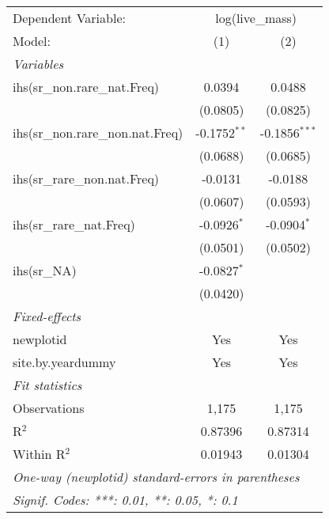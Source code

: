 \begin{tabular}{lcc}
\tabularnewline\midrule\midrule
Dependent Variable:&\multicolumn{2}{c}{log(live\_mass)}\\
Model:&(1) & (2)\\
\midrule \emph{Variables}&   &  \\
ihs(sr\_non.rare\_nat.Freq)&0.0394 & 0.0488\\
  &(0.0805) & (0.0825)\\
ihs(sr\_non.rare\_non.nat.Freq)&-0.1752$^{**}$ & -0.1856$^{***}$\\
  &(0.0688) & (0.0685)\\
ihs(sr\_rare\_non.nat.Freq)&-0.0131 & -0.0188\\
  &(0.0607) & (0.0593)\\
ihs(sr\_rare\_nat.Freq)&-0.0926$^{*}$ & -0.0904$^{*}$\\
  &(0.0501) & (0.0502)\\
ihs(sr\_NA)&-0.0827$^{*}$ &   \\
  &(0.0420) &   \\
\midrule \emph{Fixed-effects}&   &  \\
newplotid & Yes & Yes\\
site.by.yeardummy & Yes & Yes\\
\midrule \emph{Fit statistics}&  & \\
Observations & 1,175&1,175\\
R$^2$ & 0.87396&0.87314\\
Within R$^2$ & 0.01943&0.01304\\
\midrule\midrule\multicolumn{3}{l}{\emph{One-way (newplotid) standard-errors in parentheses}}\\
\multicolumn{3}{l}{\emph{Signif. Codes: ***: 0.01, **: 0.05, *: 0.1}}\\
\end{tabular}


